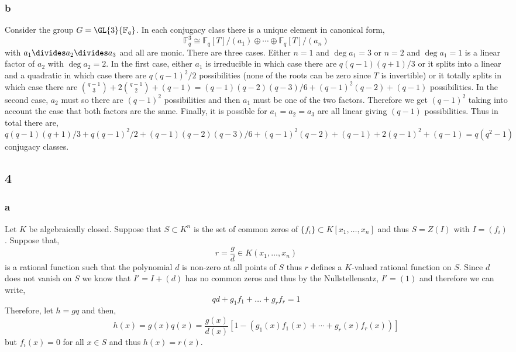 \documentclass[12pt]{article}
\renewcommand{\F}{\mathbb{F}}
\begin{document}
\subsubsection{b}

Consider the group $G = \GL{3}{\F_q}$. In each conjugacy class there is a unique element in canonical form,
\[ \F_q^3 \cong \F_q[T]/(a_1) \oplus \cdots \oplus \F_q[T]/(a_n) \]
with $a_1 \divides a_2 \divides a_3$ and all are monic. There are three cases. Either $n = 1$ and $\deg{a_1} = 3$ or $n = 2$ and $\deg{a_1} = 1$ is a linear factor of $a_2$ with $\deg{a_2} = 2$. In the first case, either $a_1$ is irreducible in which case there are $q(q-1)(q+1)/3$ or it splits into a linear and a quadratic in which case there are $q(q-1)^2/2$ possibilities (none of the roots can be zero since $T$ is invertible) or it totally splits in which case there are ${ q - 1 \choose 3 } + 2 { q - 1 \choose 2} + (q-1) = (q - 1)(q - 2)(q - 3) / 6 + (q - 1)^2 (q-2) + (q-1)$ possibilities. In the second case, $a_2$ must so there are $(q-1)^2$ possibilities and then $a_1$ must be one of the two factors. Therefore we get $(q-1)^2$ taking into account the case that both factors are the same. Finally, it is possible for $a_1 = a_2 = a_3$ are all linear giving $(q-1)$ possibilities. Thus in total there are,
\[  q(q-1)(q+1)/3 + q(q-1)^2/2 + (q - 1)(q - 2)(q - 3) / 6 + (q - 1)^2 (q-2) + (q-1) + 2 (q-1)^2 + (q-1)  = q(q^2 - 1) \]
conjugacy classes.

\subsection{4}

\subsubsection{a}

Let $K$ be algebraically closed. Suppose that $S \subset K^n$ is the set of common zeros of $\{ f_i \} \subset K[x_1, \dots, x_n]$ and thus $S = Z(I)$ with $I = (f_i)$. Suppose that,
\[ r = \frac{g}{d} \in K(x_1, \dots, x_n) \]
is a rational function such that the polynomial $d$ is non-zero at all points of $S$ thus $r$ defines a $K$-valued rational function on $S$. Since $d$ does not vanish on $S$ we know that $I' = I + (d)$ has no common zeros and thus by the Nullstellensatz, $I' = (1)$ and therefore we can write,
\[ q d + g_1 f_1 + \dots + g_r f_r = 1 \]
Therefore, let $h = g q$ and then,
\[ h(x) = g(x) q(x) = \frac{g(x)}{d(x)} [1 - (g_1(x) f_1(x) + \cdots + g_r(x) f_r(x))] \]
but $f_i(x) = 0$ for all $x \in S$ and thus $h(x) = r(x)$. 
\end{document}
